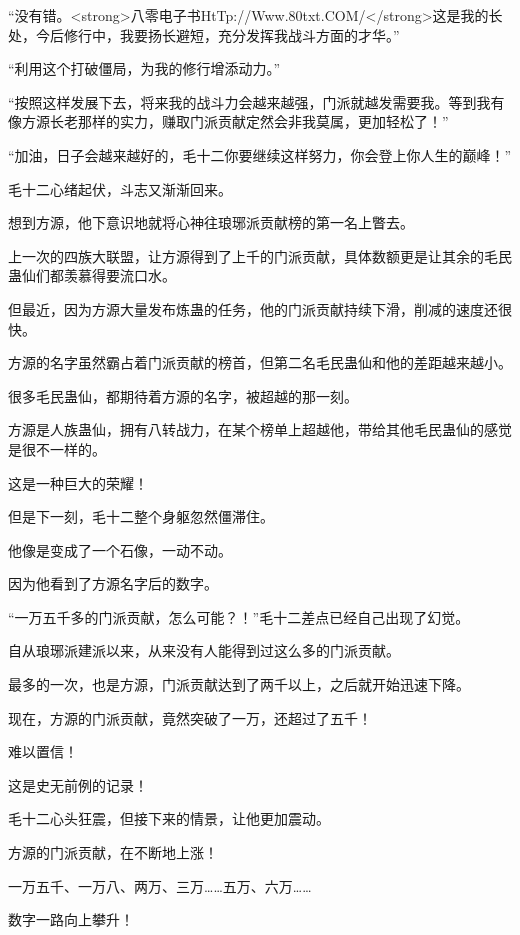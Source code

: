 
\begin{this_body}

“没有错。<strong>八零电子书HtTp://Www.80txt.COM/</strong>这是我的长处，今后修行中，我要扬长避短，充分发挥我战斗方面的才华。”

“利用这个打破僵局，为我的修行增添动力。”

“按照这样发展下去，将来我的战斗力会越来越强，门派就越发需要我。等到我有像方源长老那样的实力，赚取门派贡献定然会非我莫属，更加轻松了！”

“加油，日子会越来越好的，毛十二你要继续这样努力，你会登上你人生的巅峰！”

毛十二心绪起伏，斗志又渐渐回来。

想到方源，他下意识地就将心神往琅琊派贡献榜的第一名上瞥去。

上一次的四族大联盟，让方源得到了上千的门派贡献，具体数额更是让其余的毛民蛊仙们都羡慕得要流口水。

但最近，因为方源大量发布炼蛊的任务，他的门派贡献持续下滑，削减的速度还很快。

方源的名字虽然霸占着门派贡献的榜首，但第二名毛民蛊仙和他的差距越来越小。

很多毛民蛊仙，都期待着方源的名字，被超越的那一刻。

方源是人族蛊仙，拥有八转战力，在某个榜单上超越他，带给其他毛民蛊仙的感觉是很不一样的。

这是一种巨大的荣耀！

但是下一刻，毛十二整个身躯忽然僵滞住。

他像是变成了一个石像，一动不动。

因为他看到了方源名字后的数字。

“一万五千多的门派贡献，怎么可能？！”毛十二差点已经自己出现了幻觉。

自从琅琊派建派以来，从来没有人能得到过这么多的门派贡献。

最多的一次，也是方源，门派贡献达到了两千以上，之后就开始迅速下降。

现在，方源的门派贡献，竟然突破了一万，还超过了五千！

难以置信！

这是史无前例的记录！

毛十二心头狂震，但接下来的情景，让他更加震动。

方源的门派贡献，在不断地上涨！

一万五千、一万八、两万、三万……五万、六万……

数字一路向上攀升！


\end{this_body}
